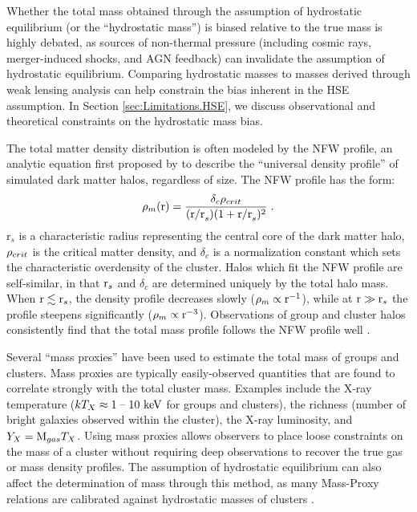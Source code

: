 Whether the total mass obtained through the assumption of hydrostatic
equilibrium (or the ``hydrostatic mass'') is biased relative to the
true mass is highly debated, as sources of non-thermal pressure
(including cosmic rays, merger-induced shocks, and AGN feedback) can
invalidate the assumption of hydrostatic equilibrium. Comparing
hydrostatic masses to masses derived through weak lensing analysis can
help constrain the bias inherent in the HSE assumption. In Section
\ref{sec:Limitations.HSE}, we discuss observational and theoretical
constraints on the hydrostatic mass bias.

The total matter density distribution is often modeled by the NFW
profile, an analytic equation first proposed by \citet{Navarro1996}
to describe the ``universal density profile'' of simulated dark matter
halos, regardless of size. The NFW profile has the form:
\begin{equation}
\rho_m(\textrm{r}) = \frac{\delta_c\rho_{crit}}{(\textrm{r/r}_s)(1 + \textrm{r/r}_s)^2}\;.
\end{equation}
r$_s$ is a characteristic radius representing the central core of the
dark matter halo, $\rho_{crit}$ is the critical matter density, and
$\delta_c$ is a normalization constant which sets the characteristic
overdensity of the cluster. Halos which fit the NFW profile are
self-similar, in that $\textrm{r}_s$ and $\delta_c$ are determined
uniquely by the total halo mass. When $\textrm{r} \lesssim \textrm{r}_s$, the
density profile decreases slowly ($\rho_m \propto \textrm{r}^{-1}$),
while at $\textrm{r} \gg \textrm{r}_s$ the profile steepens significantly ($\rho_m
\propto \textrm{r}^{-3}$). Observations of group and cluster halos
consistently find that the total mass profile follows the NFW profile
well .

Several ``mass proxies'' have been used to estimate the total mass of
groups and clusters. Mass proxies are typically easily-observed
quantities that are found to correlate strongly with the total cluster
mass. Examples include the X-ray temperature
($kT_X\approx1\;\textrm{--}\;10~\textrm{keV}{}$ for groups and clusters), the richness
(number of bright galaxies observed within the cluster), the X-ray
luminosity, and $Y_X = \textrm{M}_{gas}T_X$. Using mass proxies allows
observers to place loose constraints on the mass of a cluster without
requiring deep observations to recover the true gas or mass density
profiles. The assumption of hydrostatic equilibrium can also affect
the determination of mass through this method, as many Mass-Proxy
relations are calibrated against hydrostatic masses of clusters
.

